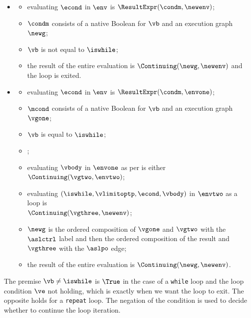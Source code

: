 \ProseParagraph
\OneApplies
\begin{itemize}
\item {}
  \begin{itemize}
    \item evaluating $\econd$ in $\env$ is $\ResultExpr(\condm, \newenv)$\ProseOrAbnormal;
    \item $\condm$ consists of a native Boolean for $\vb$ and an execution graph $\newg$;
    \item $\vb$ is not equal to $\iswhile$;
    \item the result of the entire evaluation is $\Continuing(\newg, \newenv)$
    and the loop is exited.
  \end{itemize}
\item {}
  \begin{itemize}
    \item evaluating $\econd$ in $\env$ is $\ResultExpr(\condm, \envone)$\ProseOrAbnormal;
    \item $\mcond$ consists of a native Boolean for $\vb$ and an execution graph $\vgone$;
    \item $\vb$ is equal to $\iswhile$;
    \item \Proseticklooplimit{$\vlimitopt$}{$\vlimitoptp$}\ProseOrError;
    \item evaluating $\vbody$ in $\envone$ as per  is either \\
          $\Continuing(\vgtwo, \envtwo)$\ProseTerminateAs{\ReturningConfig, \ThrowingConfig, \DynErrorConfig, \TDiverging};
    \item evaluating $(\iswhile, \vlimitoptp, \econd, \vbody)$ in $\envtwo$ as a loop is \\
          $\Continuing(\vgthree, \newenv)$\ProseTerminateAs{\ReturningConfig, \ThrowingConfig, \DynErrorConfig, \TDiverging};
    \item $\newg$ is the ordered composition of $\vgone$ and $\vgtwo$ with the $\aslctrl$ label
          and then the ordered composition of the result and $\vgthree$ with the $\aslpo$ edge;
    \item the result of the entire evaluation is $\Continuing(\newg, \newenv)$.
  \end{itemize}
\end{itemize}

\FormallyParagraph
The premise $\vb \neq \iswhile$ is $\True$ in the case of a \texttt{while} loop
and the loop condition $\ve$ not holding, which is exactly when we want the
loop to exit. The opposite holds for a \texttt{repeat} loop.
The negation of the condition is used to decide whether to continue the loop iteration.

